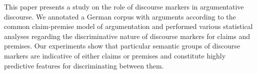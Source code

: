 This paper presents a study on the role of discourse markers in argumentative discourse. We annotated a German corpus with arguments according to the common claim-premise model of argumentation and performed various statistical analyses regarding the discriminative nature of discourse markers for claims and premises. Our experiments show that particular semantic groups of discourse markers are indicative of either claims or premises and constitute highly predictive features for discriminating between them.
